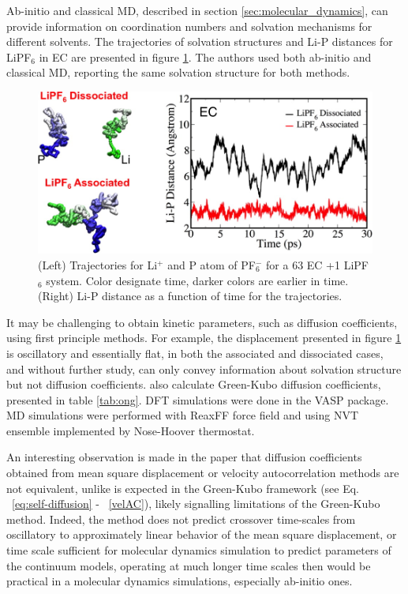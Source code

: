 \documentclass[../main.tex]{subfiles}
\begin{document}
Ab-initio and classical MD, described in section \ref{sec:molecular_dynamics}, can provide information on coordination numbers and solvation mechanisms for different solvents. \cite{Ong2015} The trajectories of solvation structures and Li-P distances for LiPF$_6$ in EC are presented in figure \ref{fig:Ong2015}. The authors used both ab-initio and classical MD, reporting the same solvation structure for both methods.

\begin{figure}
    \centering
    \includegraphics{figures/aimd.jpeg}
    \caption{(Left) Trajectories for Li$^+$ and P atom of PF$^-_6$ for a 63 EC +1 LiPF$_6$ system\cite{Ong2015}. Color designate time, darker colors are earlier in time. (Right) Li-P distance as a function of time for the trajectories.}
    \label{fig:Ong2015}
\end{figure}

It may be challenging to obtain kinetic parameters, such as diffusion coefficients, using first principle methods. For example, the displacement presented in figure \ref{fig:Ong2015} is oscillatory and essentially flat, in both the associated and dissociated cases, and without further study, can only convey information about solvation structure but not diffusion coefficients. \citeauthor{Ong2015} also calculate Green-Kubo diffusion coefficients, presented in table \ref{tab:ong}. DFT simulations were done in the VASP package. MD simulations were performed with ReaxFF force field and using NVT ensemble implemented by Nose-Hoover thermostat.

An interesting observation is made in the paper that diffusion coefficients obtained from mean square displacement or velocity autocorrelation methods are not equivalent, unlike is expected in the Green-Kubo framework (see Eq. ~\ref{eq:self-diffusion} - ~\ref{velAC}), likely signalling limitations of the Green-Kubo method. Indeed, the method does not predict crossover time-scales from oscillatory to approximately linear behavior of the mean square displacement, or time scale sufficient for molecular dynamics simulation to predict parameters of the continuum models, operating at much longer time scales then would be practical in a molecular dynamics simulations, especially ab-initio ones.
\end{document}
